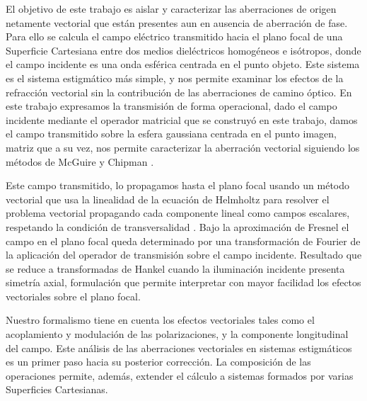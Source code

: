 El objetivo de este trabajo es aislar y caracterizar las aberraciones de
origen netamente vectorial que están presentes aun en ausencia de aberración de
fase. Para ello se calcula el campo eléctrico transmitido hacia el plano focal de una Superficie Cartesiana entre dos medios dieléctricos homogéneos e isótropos, donde el campo incidente es una onda esférica centrada en el punto objeto.
Este sistema es el sistema estigmático más simple, y nos permite examinar los efectos de la refracción vectorial sin la contribución de las aberraciones de camino óptico. 
En este trabajo expresamos la transmisión de forma operacional, dado el campo incidente mediante el operador matricial que se construyó en este trabajo, damos el campo transmitido sobre la esfera gaussiana centrada en el punto imagen, matriz que a su vez, nos permite caracterizar la aberración vectorial siguiendo los métodos de McGuire y Chipman \cite{McGuire1991Response}. 

Este campo transmitido, lo propagamos hasta el plano focal usando un método vectorial que usa la linealidad de la ecuación de Helmholtz para resolver el problema vectorial propagando cada componente lineal como campos escalares, respetando la condición de transversalidad \cite{Song2025}. Bajo la aproximación de Fresnel el campo en el plano focal queda determinado por una transformación de Fourier de la aplicación del operador de transmisión sobre el campo incidente. Resultado que se reduce a transformadas de Hankel cuando la iluminación incidente presenta simetría axial, formulación que permite interpretar con mayor facilidad los efectos vectoriales sobre el plano focal.

Nuestro formalismo tiene en cuenta los efectos vectoriales tales como el acoplamiento y modulación de las polarizaciones, y la componente longitudinal del campo. Este análisis de las aberraciones vectoriales en sistemas estigmáticos es un primer paso hacia su posterior corrección. La composición de las operaciones permite, además, extender el cálculo a sistemas formados por varias Superficies Cartesianas.
